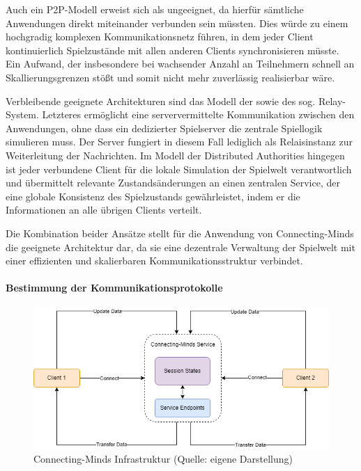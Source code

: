 Auch ein \ac{P2P}-Modell erweist sich als ungeeignet, da hierfür sämtliche Anwendungen direkt miteinander verbunden sein müssten. Dies würde zu einem hochgradig komplexen Kommunikationsnetz führen, in dem jeder Client kontinuierlich Spielzustände mit allen anderen Clients synchronisieren müsste. Ein Aufwand, der insbesondere bei wachsender Anzahl an Teilnehmern schnell an Skallierungsgrenzen stößt und somit nicht mehr zuverlässig realisierbar wäre.

Verbleibende geeignete Architekturen sind das Modell der  sowie des sog. Relay-System. Letzteres ermöglicht eine serververmittelte Kommunikation zwischen den Anwendungen, ohne dass ein dedizierter Spielserver die zentrale Spiellogik simulieren muss. Der Server fungiert in diesem Fall lediglich als Relaisinstanz zur Weiterleitung der Nachrichten. Im Modell der Distributed Authorities hingegen ist jeder verbundene Client für die lokale Simulation der Spielwelt verantwortlich und übermittelt relevante Zustandsänderungen an einen zentralen Service, der eine globale Konsistenz des Spielzustands gewährleistet, indem er die Informationen an alle übrigen Clients verteilt.

Die Kombination beider Ansätze stellt für die Anwendung von Connecting-Minds die geeignete Architektur dar, da sie eine dezentrale Verwaltung der Spielwelt mit einer effizienten und skalierbaren Kommunikationsstruktur verbindet.

\paragraph{Bestimmung der Kommunikationsprotokolle}

\begin{figure}[ht]
\centering
\includegraphics[width=1\linewidth]{content/pictures/CM-Archticture.png}
\caption{Connecting-Minds Infrastruktur (Quelle: eigene Darstellung)}
\label{fig:cm-topology}
\end{figure}

